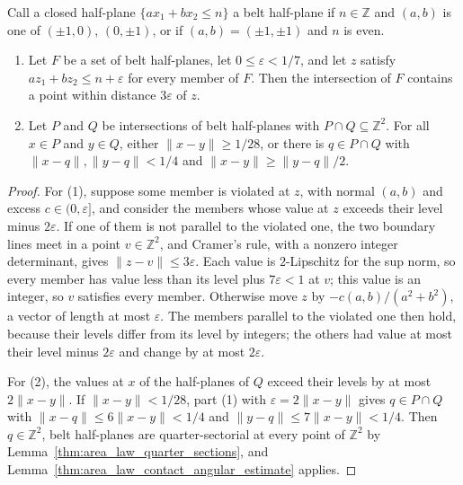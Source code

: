 \begin{lemma}
    \label{thm:area_law_belt_polygon_separation}
    \leanok
    Call a closed half-plane $\{a x_1+b x_2\le n\}$ a belt half-plane if
    $n\in\mathbb Z$ and $(a,b)$ is one of $(\pm1,0)$, $(0,\pm1)$, or if
    $(a,b)=(\pm1,\pm1)$ and $n$ is even.
    \begin{enumerate}
        \item Let $F$ be a set of belt half-planes, let
              $0\le\varepsilon<1/7$, and let $z$ satisfy
              $a z_1+b z_2\le n+\varepsilon$ for every member of $F$. Then
              the intersection of $F$ contains a point within distance
              $3\varepsilon$ of $z$.
        \item Let $P$ and $Q$ be intersections of belt half-planes with
              $P\cap Q\subseteq\mathbb Z^2$. For all $x\in P$ and
              $y\in Q$, either $\|x-y\|\ge1/28$, or there is
              $q\in P\cap Q$ with $\|x-q\|,\|y-q\|<1/4$ and
              $\|x-y\|\ge\|y-q\|/2$.
    \end{enumerate}
\end{lemma}

\begin{proof}
    \leanok
    For (1), suppose some member is violated at $z$, with normal $(a,b)$ and
    excess $c\in(0,\varepsilon]$, and consider the members whose value at
    $z$ exceeds their level minus $2\varepsilon$. If one of them is not
    parallel to the violated one, the two boundary lines meet in a point
    $v\in\mathbb Z^2$, and Cramer's rule, with a nonzero integer
    determinant, gives $\|z-v\|\le3\varepsilon$. Each value is
    $2$-Lipschitz for the sup norm, so every member has value less than its
    level plus $7\varepsilon<1$ at $v$; this value is an integer, so $v$
    satisfies every member. Otherwise move $z$ by $-c(a,b)/(a^2+b^2)$, a
    vector of length at most $\varepsilon$. The members parallel to the
    violated one then hold, because their levels differ from its level by
    integers; the others had value at most their level minus
    $2\varepsilon$ and change by at most $2\varepsilon$.

    For (2), the values at $x$ of the half-planes of $Q$ exceed their levels
    by at most $2\|x-y\|$. If $\|x-y\|<1/28$, part (1) with
    $\varepsilon=2\|x-y\|$ gives $q\in P\cap Q$ with
    $\|x-q\|\le6\|x-y\|<1/4$ and $\|y-q\|\le7\|x-y\|<1/4$. Then
    $q\in\mathbb Z^2$, belt half-planes are quarter-sectorial at every point
    of $\mathbb Z^2$ by Lemma~\ref{thm:area_law_quarter_sections}, and
    Lemma~\ref{thm:area_law_contact_angular_estimate} applies.
\end{proof}

